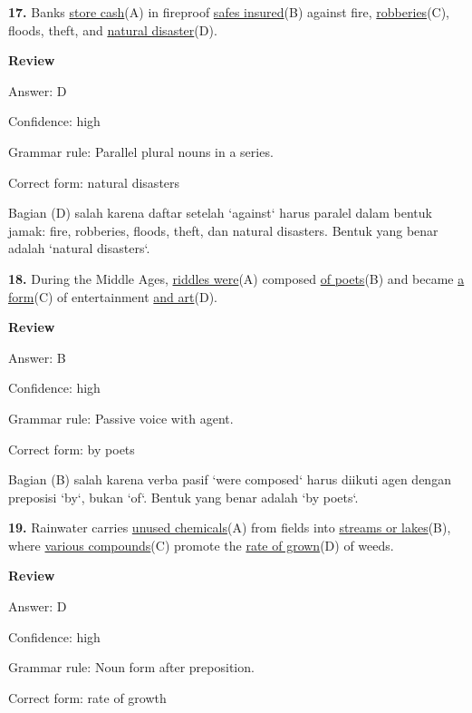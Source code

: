 \documentclass[12pt]{article}
\begin{document}
\endgroup
\par
\vspace{\questionblockgap}
\noindent\textbf{17.} Banks \uline{store cash}(A) in fireproof \uline{safes insured}(B) against fire, \uline{robberies}(C), floods, theft, and \uline{natural disaster}(D).
\par
\begingroup
\setlength{\parskip}{0pt}
\setlength{\parindent}{0pt}
\textbf{Review}\par
Answer: D\par
Confidence: high\par
Grammar rule: Parallel plural nouns in a series.\par
Correct form: natural disasters\par
Bagian (D) salah karena daftar setelah `against` harus paralel dalam bentuk jamak: fire, robberies, floods, theft, dan natural disasters. Bentuk yang benar adalah `natural disasters`.\par
\endgroup
\par
\vspace{\questionblockgap}
\noindent\textbf{18.} During the Middle Ages, \uline{riddles were}(A) composed \uline{of poets}(B) and became \uline{a form}(C) of entertainment \uline{and art}(D).
\par
\begingroup
\setlength{\parskip}{0pt}
\setlength{\parindent}{0pt}
\textbf{Review}\par
Answer: B\par
Confidence: high\par
Grammar rule: Passive voice with agent.\par
Correct form: by poets\par
Bagian (B) salah karena verba pasif `were composed` harus diikuti agen dengan preposisi `by`, bukan `of`. Bentuk yang benar adalah `by poets`.\par
\endgroup
\par
\vspace{\questionblockgap}
\noindent\textbf{19.} Rainwater carries \uline{unused chemicals}(A) from fields into \uline{streams or lakes}(B), where \uline{various compounds}(C) promote the \uline{rate of grown}(D) of weeds.
\par
\begingroup
\setlength{\parskip}{0pt}
\setlength{\parindent}{0pt}
\textbf{Review}\par
Answer: D\par
Confidence: high\par
Grammar rule: Noun form after preposition.\par
Correct form: rate of growth\par
\end{document}
